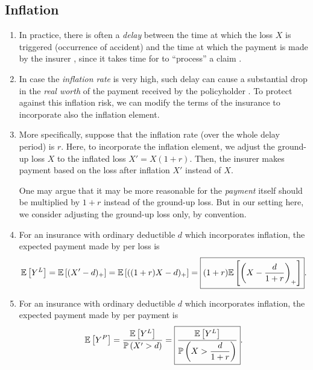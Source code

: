 \subsection{Inflation}
\begin{enumerate}
\item In practice, there is often a \emph{delay} between the time at which the loss
\(X\) is triggered (occurrence of accident) and the time at which the payment
 is made by the insurer , since it takes
time for  to ``process''  a claim
.

\item In case the \emph{inflation rate}  is very high, such
delay can cause a substantial drop in the \emph{real worth} of the payment
received by the policyholder . To protect against this inflation
risk, we can modify the terms of the insurance to incorporate also the
inflation element.

\item \label{it:inflation-setting}
More specifically, suppose that the inflation rate (over the whole delay
period) is \(r\). Here, to incorporate the inflation element, we adjust the
ground-up loss \(X\) to the inflated loss \(X'=X(1+r)\). Then, the
insurer makes payment based on the loss after inflation \(X'\) instead of
\(X\).

\begin{note}
One may argue that it may be more reasonable for the \emph{payment} itself
should be multiplied by \(1+r\) instead of the ground-up loss. But in our
setting here, we consider adjusting the ground-up loss only, by convention.
\end{note}

\item
For an insurance with ordinary deductible \(d\) which incorporates
inflation, the expected payment made by  per loss is
\[
\mathbb{E}\left[Y^L\right]=\mathbb{E}\left[(X'-d)_{+}\right]
=\mathbb{E}\left[((1+r)X-d)_{+}\right]
=\boxed{(1+r)\mathbb{E}\left[\qty(X-\frac{d}{1+r})_{+}\right]}.
\]
\item
For an insurance with ordinary deductible \(d\) which incorporates
inflation, the expected payment made by  per payment is
\[
\mathbb{E}\left[Y^P\right]=\frac{\mathbb{E}\left[Y^L\right]}{\mathbb{P}\left(X'>d\right)}
=\boxed{\frac{\mathbb{E}\left[Y^L\right]}{\displaystyle \mathbb{P}\left(X>\frac{d}{1+r}\right)}}.
\]
\end{enumerate}
